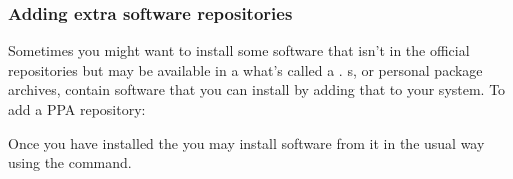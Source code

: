\subsubsection{Adding extra software repositories}

Sometimes you might want to install some software that isn't in the official repositories but may be available in a what's called a . s, or personal package archives, contain software that you can install by adding that  to your system. To add a PPA repository:

\begin{terminal}
\prompt {}
\end{terminal}

Once you have installed the  you may install software from it in the usual way using the   command.
